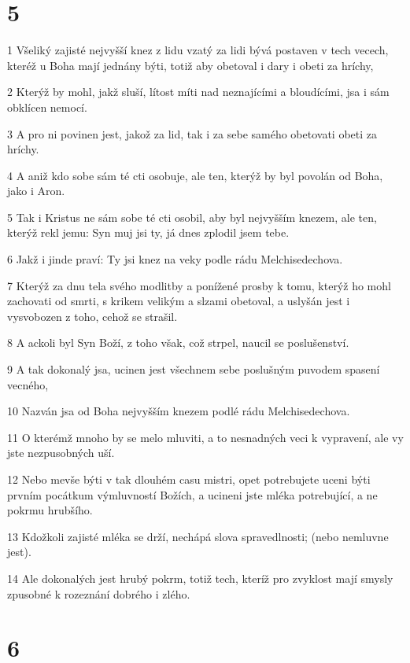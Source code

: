 \chapter{5}

\par 1 Všeliký zajisté nejvyšší knez z lidu vzatý za lidi bývá postaven v tech vecech, kteréž u Boha mají jednány býti, totiž aby obetoval i dary i obeti za hríchy,
\par 2 Kterýž by mohl, jakž sluší, lítost míti nad neznajícími a bloudícími, jsa i sám obklícen nemocí.
\par 3 A pro ni povinen jest, jakož za lid, tak i za sebe samého obetovati obeti za hríchy.
\par 4 A aniž kdo sobe sám té cti osobuje, ale ten, kterýž by byl povolán od Boha, jako i Aron.
\par 5 Tak i Kristus ne sám sobe té cti osobil, aby byl nejvyšším knezem, ale ten, kterýž rekl jemu: Syn muj jsi ty, já dnes zplodil jsem tebe.
\par 6 Jakž i jinde praví: Ty jsi knez na veky podle rádu Melchisedechova.
\par 7 Kterýž za dnu tela svého modlitby a ponížené prosby k tomu, kterýž ho mohl zachovati od smrti, s krikem velikým a slzami obetoval, a uslyšán jest i vysvobozen z toho, cehož se strašil.
\par 8 A ackoli byl Syn Boží, z toho však, což strpel, naucil se poslušenství.
\par 9 A tak dokonalý jsa, ucinen jest všechnem sebe poslušným puvodem spasení vecného,
\par 10 Nazván jsa od Boha nejvyšším knezem podlé rádu Melchisedechova.
\par 11 O kterémž mnoho by se melo mluviti, a to nesnadných veci k vypravení, ale vy jste nezpusobných uší.
\par 12 Nebo mevše býti v tak dlouhém casu mistri, opet potrebujete uceni býti prvním pocátkum výmluvností Božích, a ucineni jste mléka potrebující, a ne pokrmu hrubšího.
\par 13 Kdožkoli zajisté mléka se drží, nechápá slova spravedlnosti; (nebo nemluvne jest).
\par 14 Ale dokonalých jest hrubý pokrm, totiž tech, kteríž pro zvyklost mají smysly zpusobné k rozeznání dobrého i zlého.

\chapter{6}

